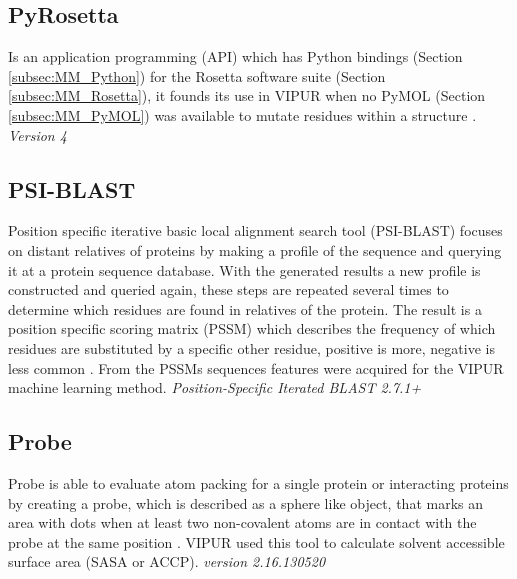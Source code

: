 \subsection{PyRosetta}
Is an application programming (API) which has Python bindings (Section \ref{subsec:MM_Python}) for the Rosetta software suite (Section \ref{subsec:MM_Rosetta}), it founds its use in VIPUR when no PyMOL (Section \ref{subsec:MM_PyMOL}) was available to mutate residues within a structure \cite{jeffrey_pyrosetta_nodate}.
\label{subsec:MM_PyRosetta}
\newline
\textit{Version 4}

\subsection{PSI-BLAST}
Position specific iterative basic local alignment search tool (PSI-BLAST) focuses on distant relatives of proteins by making a profile of the sequence and querying it at a protein sequence database. With the generated results a new profile is constructed and queried again, these steps are repeated several times to determine which residues are found in relatives of the protein. The result is a position specific scoring matrix (PSSM) which describes the frequency of which residues are substituted by a specific other residue, positive is more, negative is less common \cite{ncbi_psiblast_nodate,ncbi_pssm_nodate,wikipedia_blast_2019}.
From the PSSMs sequences features were acquired for the VIPUR machine learning method.
\label{subsec:MM_PSI_BLAST}
\newline
\textit{Position-Specific Iterated BLAST 2.7.1+}

\subsection{Probe}
Probe is able to evaluate atom packing for a single protein or interacting proteins by creating a probe, which is described as a sphere like object, that marks an area with dots when at least two non-covalent atoms are in contact with the probe at the same position \cite{word_visualizing_1999, richardson_lab_probe_nodate}. VIPUR used this tool to calculate solvent accessible surface area (SASA or ACCP).
\label{subsec:MM_Probe}
\newline
\textit{version 2.16.130520}

